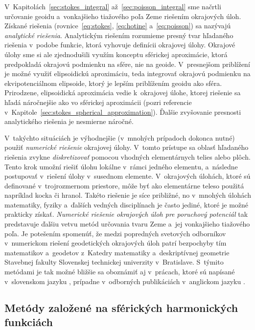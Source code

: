\documentclass[a4paper, 12pt]{book}
\begin{document}
V~Kapitolách~\ref{sec:stokes_integral} až~\ref{sec:poisson_integral} sme 
načrtli určovanie geoidu a~vonkajšieho tiažového poľa Zeme riešením okrajových 
úloh.  Získané riešenia (rovnice~\ref{eq:stokes}, \ref{eq:hotine} 
a~\ref{eq:poisson}) sa nazývajú \emph{analytické riešenia}.  Analytickým 
riešením rozumieme presný tvar hľadaného riešenia v~podobe funkcie, ktorá 
vyhovuje definícii okrajovej úlohy.  Okrajové úlohy sme si ale zjednodušili 
využím konceptu sférickej aproximácie, ktorá predpokladá okrajovú podmienku na 
sfére, nie na geoide.  V~presnejšom priblížení je možné využiť elipsoidickú 
aproximáciu, teda integrovať okrajovú podmienku na ekvipotenciálnom elipsoide, 
ktorý je lepším priblížením geoidu ako sféra.  Prirodzene, elipsoidická 
aproximácia vedie k~okrajovej úlohe, ktorej riešenie sa hľadá náročnejšie ako 
vo sférickej aproximácii (pozri referencie 
v~Kapitole~\ref{sec:stokes_spherical_approximation}).  Ďalšie zvyšovanie 
presnosti analytického riešenia je nesmierne náročné.

V~takýchto situáciách je výhodnejšie (v~mnohých prípadoch dokonca nutné) použiť 
\emph{numerické riešenie} okrajovej úlohy.  V~tomto prístupe sa oblasť 
hľadaného riešenia zvykne \emph{diskretizovať} pomocou vhodných elementárnych 
telies alebo plôch.  Tento krok umožní riešiť úlohu lokálne v~rámci jedného 
elementu, a~následne postupovať v~riešení úlohy v~susednom elemente.  
V~okrajových úlohách, ktoré sú definované v~trojrozmernom priestore, môže byť 
ako elementárne teleso použitá napríklad kocka či hranol.  Takéto riešenie je 
síce približné, no v~mnohých úlohách matematiky, fyziky a~ďalších vedných 
disciplínach je často jediné, ktoré je možné prakticky získať.  \emph{Numerické 
riešenie okrajových úloh pre poruchový potenciál} tak predstavuje ďalšiu vetvu 
metód určovania tvaru Zeme a~jej vonkajšieho tiažového poľa.  Je potešením 
spomenúť, že medzi popredných svetových odborníkov v~numerickom riešení 
geodetických okrajových úloh patrí bezpochyby tím matematikov a~geodetov 
z~Katedry matematiky a~deskriptívnej geometrie Stavebnej fakulty Slovenskej 
technickej univerzity v~Bratislave.  S~týmito metódami je tak možné bližšie sa 
oboznámiť aj v~prácach, ktoré sú napísané v~slovenskom jazyku 
\parencite[napríklad][]{Janak2006,Macak2021}, prípadne v~odborných publikáciách 
v~anglickom jazyku 
\parencite[napríklad][]{Cunderlik2008,Faskova2010,Macak2014}.


\subsection{Metódy založené na sférických harmonických funkciách}
\end{document}
